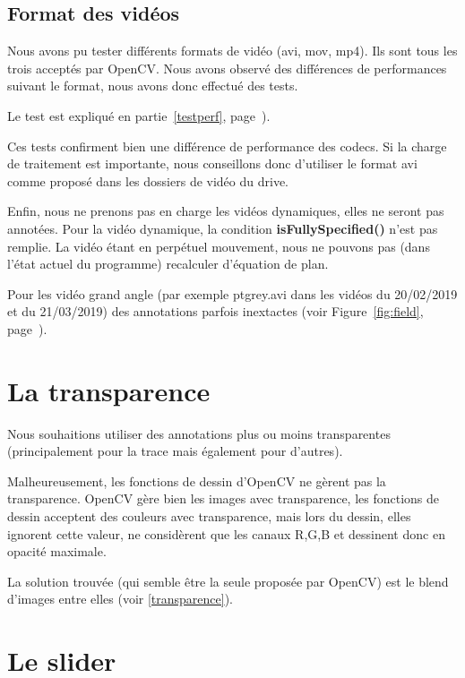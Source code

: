 \subsection{Format des vidéos}

Nous avons pu tester différents formats de vidéo (avi, mov, mp4).
Ils sont tous les trois acceptés par OpenCV. Nous avons observé
des différences de performances suivant le format, nous avons
donc effectué des tests.

\bigskip

Le test est expliqué en partie~\ref{testperf},
page~\pageref{testperf}). 
\bigskip

Ces tests confirment bien une différence de performance des
codecs.
Si la charge de traitement est importante, nous conseillons donc
d'utiliser le format avi comme proposé dans les dossiers de vidéo
du drive.
\bigskip

Enfin, nous ne prenons pas en charge les vidéos dynamiques, elles
ne seront pas annotées. Pour la vidéo dynamique, la condition
\textbf{isFullySpecified()} n'est pas remplie. La vidéo étant en
perpétuel mouvement, nous ne pouvons pas (dans l'état actuel du
programme) recalculer d'équation de plan.
\bigskip

Pour les vidéo grand angle (par exemple ptgrey.avi dans les
vidéos du 20/02/2019 et du 21/03/2019) des annotations parfois
inextactes (voir Figure~\ref{fig:field},
page~\pageref{fig:field}).

\section{La transparence}
Nous souhaitions utiliser des annotations plus ou moins
transparentes (principalement pour la trace mais également pour
d'autres). 
\bigskip

Malheureusement, les fonctions de dessin d'OpenCV ne gèrent pas
la transparence. OpenCV gère bien les images avec transparence,
les fonctions de dessin acceptent des couleurs avec transparence,
mais lors du dessin, elles ignorent cette valeur, ne considèrent
que les canaux R,G,B et dessinent donc en opacité maximale.
\bigskip

La solution trouvée (qui semble être la seule proposée par
OpenCV) est le blend d'images entre elles (voir
\ref{transparence}).



\section{Le slider}

